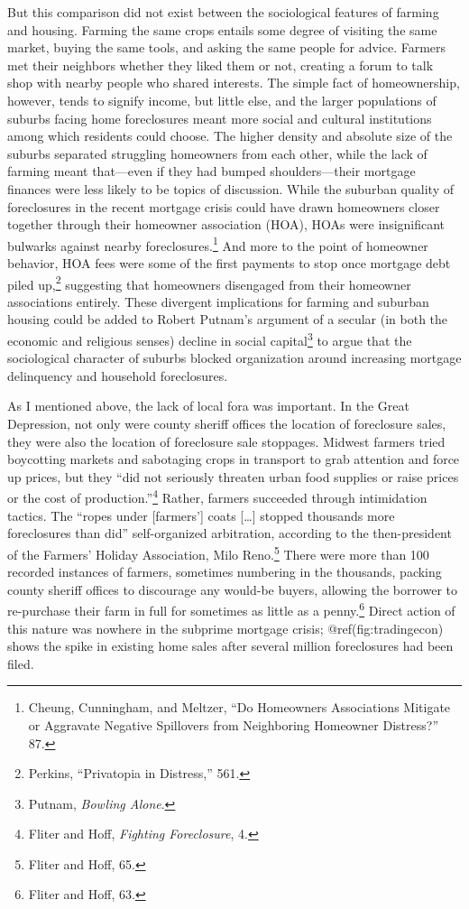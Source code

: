 \documentclass[
]{article}
\let\rmarkdownfootnote\footnote%
\def\footnote{\protect\rmarkdownfootnote}
\begin{document}
But this comparison did not exist between the sociological features of
farming and housing. Farming the same crops entails some degree of
visiting the same market, buying the same tools, and asking the same
people for advice. Farmers met their neighbors whether they liked them
or not, creating a forum to talk shop with nearby people who shared
interests. The simple fact of homeownership, however, tends to signify
income, but little else, and the larger populations of suburbs facing
home foreclosures meant more social and cultural institutions among
which residents could choose. The higher density and absolute size of
the suburbs separated struggling homeowners from each other, while the
lack of farming meant that---even if they had bumped shoulders---their
mortgage finances were less likely to be topics of discussion. While the
suburban quality of foreclosures in the recent mortgage crisis could
have drawn homeowners closer together through their homeowner
association (HOA), HOAs were insignificant bulwarks against nearby
foreclosures.\footnote{Cheung, Cunningham, and Meltzer, ``Do Homeowners
  Associations Mitigate or Aggravate Negative Spillovers from
  Neighboring Homeowner Distress?'' 87.} And more to the point of
homeowner behavior, HOA fees were some of the first payments to stop
once mortgage debt piled up,\footnote{Perkins, ``Privatopia in
  Distress,'' 561.} suggesting that homeowners disengaged from their
homeowner associations entirely. These divergent implications for
farming and suburban housing could be added to Robert Putnam's argument
of a secular (in both the economic and religious senses) decline in
social capital\footnote{Putnam, \emph{Bowling Alone}.} to argue that the
sociological character of suburbs blocked organization around increasing
mortgage delinquency and household foreclosures.

As I mentioned above, the lack of local fora was important. In the Great
Depression, not only were county sheriff offices the location of
foreclosure sales, they were also the location of foreclosure sale
stoppages. Midwest farmers tried boycotting markets and sabotaging crops
in transport to grab attention and force up prices, but they ``did not
seriously threaten urban food supplies or raise prices or the cost of
production.''\footnote{Fliter and Hoff, \emph{Fighting Foreclosure}, 4.}
Rather, farmers succeeded through intimidation tactics. The ``ropes
under {[}farmers'{]} coats {[}\ldots{]} stopped thousands more
foreclosures than did'' self-organized arbitration, according to the
then-president of the Farmers' Holiday Association, Milo Reno.\footnote{Fliter
  and Hoff, 65.} There were more than 100 recorded instances of farmers,
sometimes numbering in the thousands, packing county sheriff offices to
discourage any would-be buyers, allowing the borrower to re-purchase
their farm in full for sometimes as little as a penny.\footnote{Fliter
  and Hoff, 63.} Direct action of this nature was nowhere in the
subprime mortgage crisis; @ref(fig:tradingecon) shows the spike in
existing home sales after several million foreclosures had been filed.
\end{document}
